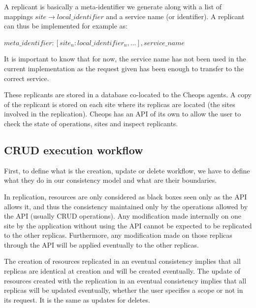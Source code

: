 A replicant is basically a meta-identifier we generate along with a
list of mappings $site \rightarrow local\_identifier$ and a service
name (or identifier).
%
A replicant can thus be implemented for example as:

$ { meta\_identifier: [ site_n: local\_identifier_n, ...], service\_name} $


It is important to know that for now, the service name has not been
used in the current implementation as the request given has been
enough to transfer to the correct service.

These replicants are stored in a database co-located to the Cheops
agents.
%
A copy of the replicant is stored on each site where its replicas are
located (the sites involved in the replication).
%
Cheops has an API of its own to allow the user to check the state of
operations, sites and inspect replicants.


\subsection{CRUD execution workflow}


First, to define what is the creation, update or delete workflow, we
have to define what they do in our consistency model and what are
their boundaries.

In replication, resources are only considered as black boxes seen only
as the API allows it, and thus the consistency maintained only by the
operations allowed by the API (usually CRUD operations).
%
Any modification made internally on one site by the application
without using the API cannot be expected to be replicated to the other
replicas.
%
Furthermore, any modification made on those replicas through the API
will be applied eventually to the other replicas.

%
The creation of resources replicated in an eventual consistency
implies that all replicas are identical at creation and will be
created eventually.
%
The update of resources created with the replication in an eventual
consistency implies that all replicas will be updated eventually,
whether the user specifies a scope or not in its request.
%
It is the same as updates for deletes.

